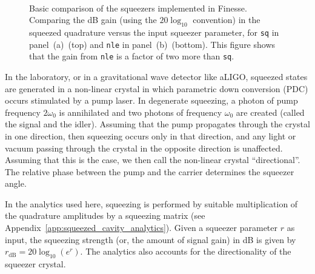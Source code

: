 \documentclass[aps,pra,superscriptaddress,reprint,nofootinbib]{revtex4-1}
\newcommand{\code}[1]{\texttt{#1}}
\begin{document}
\begin{figure}[ht]%
    \centering
    \\
    \caption{Basic comparison of the squeezers implemented in Finesse. Comparing the dB gain (using the $20 \log_{10}$ convention) in the squeezed quadrature versus the input squeezer parameter, for \code{sq} in panel~(a)~(top) and \code{nle} in panel~(b)~(bottom). This figure shows that the gain from \code{nle} is a factor of two more than \code{sq}.}%
    \label{fig:testing_Finesse_squeezers}%
\end{figure}

In the laboratory, or in a gravitational wave detector like aLIGO, squeezed states are generated in a non-linear crystal in which parametric down conversion (PDC) occurs stimulated by a pump laser. In degenerate squeezing, a photon of pump frequency $2\omega_0$ is annihilated and two photons of frequency $\omega_0$ are created (called the signal and the idler).
Assuming that the pump propagates through the crystal in one direction, then squeezing occurs only in that direction, and any light or vacuum passing through the crystal in the opposite direction is unaffected. Assuming that this is the case, we then call the non-linear crystal ``directional''.
The relative phase between the pump and the carrier determines the squeezer angle.


In the analytics used here, squeezing is performed by suitable multiplication of the quadrature amplitudes by a squeezing matrix (see Appendix~\ref{app:squeezed_cavity_analytics}). Given a squeezer parameter $r$ as input, the squeezing strength (or, the amount of signal gain) in dB is given by $r_{\mathrm{dB}} = 20 \log_{10}(e^r)$. The analytics also accounts for the directionality of the squeezer crystal.
\end{document}
